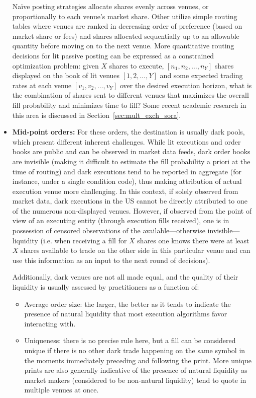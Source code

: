 \begin{itemize}
Na\"ive posting strategies allocate shares evenly across venues, or proportionally to each venue's market share. Other utilize simple routing tables where venues are ranked in decreasing order of preference (based on market share or fees) and shares allocated sequentially up to an allowable quantity before moving on to the next venue. More quantitative routing decisions for lit passive posting can be expressed as a constrained optimization problem: given $X$ shares to execute, $[n_1, n_2, \ldots, n_Y]$ shares displayed on the book of lit venues $[1, 2, \ldots, Y]$ and some expected trading rates at each venue $[v_1, v_2, \ldots, v_Y]$ over the desired execution horizon, what is the combination of shares sent to different venues that maximizes the overall fill probability and minimizes time to fill? Some recent academic research in this area is discussed in Section~\ref{sec:mult_exch_sora}.


\item \textbf{Mid-point orders:} For these orders, the destination is usually dark pools, which present different inherent challenges. While lit executions and order books are public and can be observed in market data feeds, dark order books are invisible (making it difficult to estimate the fill probability a priori at the time of routing) and dark executions tend to be reported in aggregate (for instance, under a single condition code), thus making attribution of actual execution venue more challenging. In this context, if solely observed from market data, dark executions in the US cannot be directly attributed to one of the numerous non-displayed venues. However, if observed from the point of view of an executing entity (through execution fills received), one is in possession of censored observations of the available---otherwise invisible---liquidity (i.e. when receiving a fill for $X$ shares one knows there were at least $X$ shares available to trade on the other side in this particular venue and can use this information as an input to the next round of decisions). 


Additionally, dark venues are not all made equal, and the quality of their liquidity is usually assessed by practitioners as a function of: 

\begin{itemize}
\item Average order size: the larger, the better as it tends to indicate the presence of natural liquidity that most execution algorithms favor interacting with.

\item Uniqueness: there is no precise rule here, but a fill can be considered unique if there is no other dark trade happening on the same symbol in the moments immediately preceding and following the print. More unique prints are also generally indicative of the presence of natural liquidity as market makers (considered to be non-natural liquidity) tend to quote in multiple venues at once.


\end{itemize}
\end{itemize}
